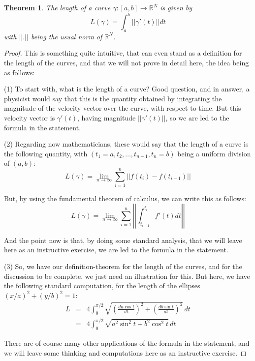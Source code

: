 \documentclass[12pt]{amsbook}
\newtheorem{theorem}{Theorem}[chapter]
\begin{document}
\begin{theorem}
The length of a curve $\gamma:[a,b]\to\mathbb R^N$ is given by
$$L(\gamma)=\int_a^b||\gamma'(t)||dt$$
with $||.||$ being the usual norm of $\mathbb R^N$.
\end{theorem}

\begin{proof}
This is something quite intuitive, that can even stand as a definition for the length of the curves, and that we will not prove in detail here, the idea being as follows:

\medskip

(1) To start with, what is the length of a curve? Good question, and in answer, a physicist would say that this is the quantity obtained by integrating the magnitude of the velocity vector over the curve, with respect to time. But this velocity vector is $\gamma'(t)$, having magnitude $||\gamma'(t)||$, so we are led to the formula in the statement.

\medskip

(2) Regarding now mathematicians, these would say that the length of a curve is the following quantity, with $(t_1=a,t_2,\ldots,t_{n-1},t_n=b)$ being a uniform division of $(a,b)$:
$$L(\gamma)=\lim_{n\to\infty}\sum_{i=1}^n||f(t_i)-f(t_{i-1})||$$

But, by using the fundamental theorem of calculus, we can write this as follows:
$$L(\gamma)=\lim_{n\to\infty}\sum_{i=1}^n\left|\left|\int_{t_{i-1}}^{t_i}f'(t)dt\right|\right|$$

And the point now is that, by doing some standard analysis, that we will leave here as an instructive exercise, we are led to the formula in the statement.

\medskip

(3) So, we have our definition-theorem for the length of the curves, and for the discussion to be complete, we just need an illustration for this. But here, we have the following standard computation, for the length of the ellipses $(x/a)^2+(y/b)^2=1$:
\begin{eqnarray*}
L
&=&4\int_0^{\pi/2}\sqrt{\left(\frac{da\cos t}{dt}\right)^2+\left(\frac{db\sin t}{dt}\right)^2}\,dt\\
&=&4\int_0^{\pi/2}\sqrt{a^2\sin^2t+b^2\cos^2t}\,dt
\end{eqnarray*}

There are of course many other applications of the formula in the statement, and we will leave some thinking and computations here as an instructive exercise.
\end{proof}
\end{document}
